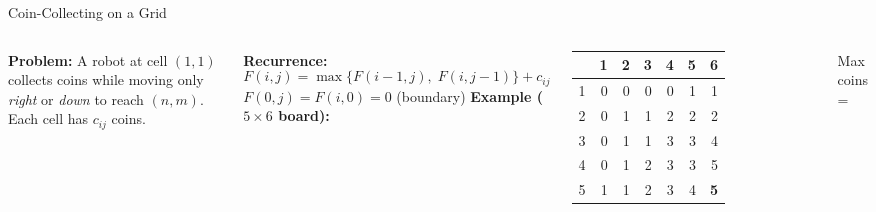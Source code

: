 \documentclass[aspectratio=169]{beamer}
\begin{document}
\begin{frame}[shrink=12]{Coin-Collecting on a Grid}
  \begin{columns}[T]
      \textbf{Problem:} A robot at cell $(1,1)$ collects coins while
      moving only \emph{right} or \emph{down} to reach $(n,m)$.
      Each cell has $c_{ij}$ coins.

      \vspace{0.3em}
      \textbf{Recurrence:}
      \[
        F(i,j) = \max\{F(i{-}1,j),\;F(i,j{-}1)\} + c_{ij}
      \]
      $F(0,j) = F(i,0) = 0$ (boundary)
      \textbf{Example ($5\times 6$ board):}
      \vspace{0.2em}

      \begin{tabular}{c*{6}{r}}
        \toprule
        & 1&2&3&4&5&6 \\
        \midrule
        1 & 0&0&0&0&1&1 \\
        2 & 0&1&1&2&2&2 \\
        3 & 0&1&1&3&3&4 \\
        4 & 0&1&2&3&3&5 \\
        5 & 1&1&2&3&4&\textbf{5} \\
        \bottomrule
      \end{tabular}
      \vspace{0.2em}
      Max coins = 
  \end{columns}
\end{frame}
\end{document}
